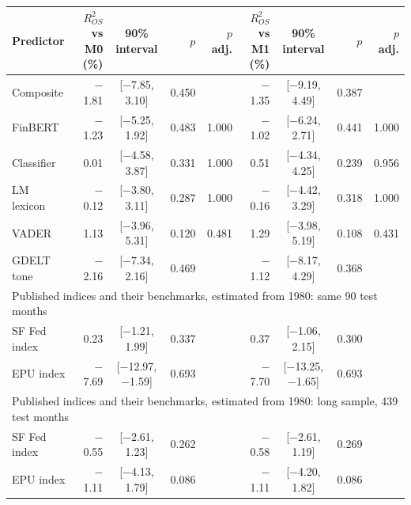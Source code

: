 \begin{tabular}{lrcrrrcrr}
\toprule
Predictor & $R^2_{OS}$ vs M0 (\%) & 90\% interval & $p$ & $p$ adj. & $R^2_{OS}$ vs M1 (\%) & 90\% interval & $p$ & $p$ adj. \\
\midrule
Composite & $-$1.81 & [$-$7.85, 3.10] & 0.450 &  & $-$1.35 & [$-$9.19, 4.49] & 0.387 &  \\
FinBERT & $-$1.23 & [$-$5.25, 1.92] & 0.483 & 1.000 & $-$1.02 & [$-$6.24, 2.71] & 0.441 & 1.000 \\
Classifier & 0.01 & [$-$4.58, 3.87] & 0.331 & 1.000 & 0.51 & [$-$4.34, 4.25] & 0.239 & 0.956 \\
LM lexicon & $-$0.12 & [$-$3.80, 3.11] & 0.287 & 1.000 & $-$0.16 & [$-$4.42, 3.29] & 0.318 & 1.000 \\
VADER & 1.13 & [$-$3.96, 5.31] & 0.120 & 0.481 & 1.29 & [$-$3.98, 5.19] & 0.108 & 0.431 \\
GDELT tone & $-$2.16 & [$-$7.34, 2.16] & 0.469 &  & $-$1.12 & [$-$8.17, 4.29] & 0.368 &  \\
\midrule
\multicolumn{9}{l}{Published indices and their benchmarks, estimated from 1980: same 90 test months} \\
SF Fed index & 0.23 & [$-$1.21, 1.99] & 0.337 &  & 0.37 & [$-$1.06, 2.15] & 0.300 &  \\
EPU index & $-$7.69 & [$-$12.97, $-$1.59] & 0.693 &  & $-$7.70 & [$-$13.25, $-$1.65] & 0.693 &  \\
\midrule
\multicolumn{9}{l}{Published indices and their benchmarks, estimated from 1980: long sample, 439 test months} \\
SF Fed index & $-$0.55 & [$-$2.61, 1.23] & 0.262 &  & $-$0.58 & [$-$2.61, 1.19] & 0.269 &  \\
EPU index & $-$1.11 & [$-$4.13, 1.79] & 0.086 &  & $-$1.11 & [$-$4.20, 1.82] & 0.086 &  \\
\bottomrule
\end{tabular}
